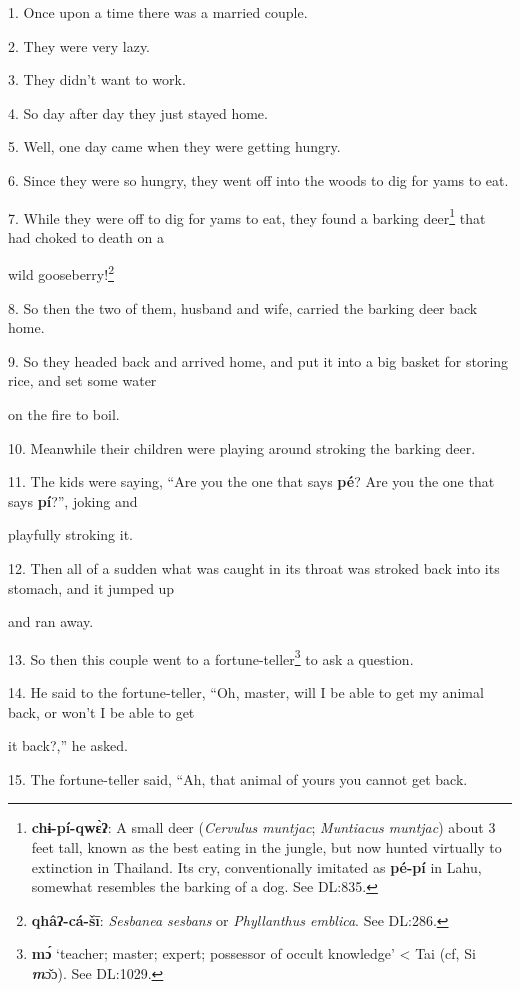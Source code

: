 \setcounter{footnote}{0}

1. Once upon a time there was a married couple.

2. They were very lazy.

3. They didn't want to work.

4. So day after day they just stayed home.

5. Well, one day came when they were getting hungry.

6. Since they were so hungry, they went off into the woods to dig for yams to eat.

7. While they were off to dig for yams to eat, they found a barking deer\footnote{\textbf{chɨ-pí-qwɛ̀ʔ}: A small deer (\textit{Cervulus muntjac}; \textit{Muntiacus muntjac}) about 3 feet tall, known as the best eating in the jungle, but now hunted virtually to extinction in Thailand. Its cry, conventionally imitated as \textbf{pé-pí} in Lahu, somewhat resembles the barking of a dog. See DL:835.} that
had choked to death on a

wild gooseberry!\footnote{\textbf{qhâʔ-cá-šī}: \textit{Sesbanea sesbans }or \textit{Phyllanthus emblica}. See DL:286.}

8. So then the two of them, husband and wife, carried the barking deer back home.

9. So they headed back and arrived home, and put it into a big basket for storing
rice, and set some water

on the fire to boil.

10. Meanwhile their children were playing around stroking the barking deer.

11. The kids were saying, ``Are you the one that says \textbf{pé}? Are you the
one that says \textbf{pí}?'', joking and

playfully stroking it.

12. Then all of a sudden what was caught in its throat was stroked back into its
stomach, and it jumped up

and ran away.

13. So then this couple went to a fortune-teller\footnote{\textbf{mɔ́} `teacher; master; expert; possessor of occult knowledge' < Tai (cf, Si \textit{\textbf{m}}ɔ̌ɔ). See DL:1029.} to ask a question.

14. He said to the fortune-teller, ``Oh, master, will I be able to get my animal
back, or won't I be able to get

it back?,'' he asked.

15. The fortune-teller said, ``Ah, that animal of yours you cannot get back.


